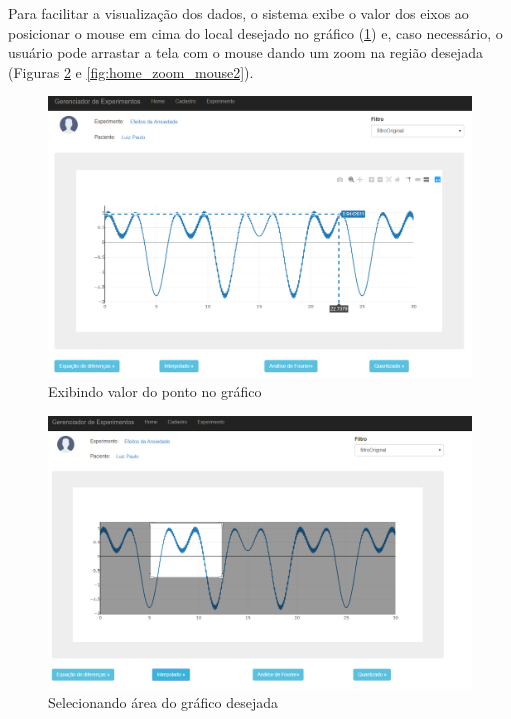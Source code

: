 Para facilitar a visualização dos dados, o sistema exibe o valor dos eixos ao posicionar o mouse em cima do local desejado no gráfico (\ref{fig:home_posicao_mouse}) e, caso necessário, o usuário pode arrastar a tela com o mouse dando um zoom na região desejada (Figuras \ref{fig:home_zoom_mouse} e \ref{fig:home_zoom_mouse2}).

\begin{figure}[h!]
	\begin{center}
		\includegraphics[width=0.8\linewidth]{images/home_posicao_mouse.png}
		\caption{Exibindo valor do ponto no gráfico}
		\label{fig:home_posicao_mouse}
	\end{center}
\end{figure}

\begin{figure}[h!]
	\begin{center}
		\includegraphics[width=0.8\linewidth]{images/home_zoom_mouse.png}
		\caption{Selecionando área do gráfico desejada}
		\label{fig:home_zoom_mouse}
	\end{center}
\end{figure}


